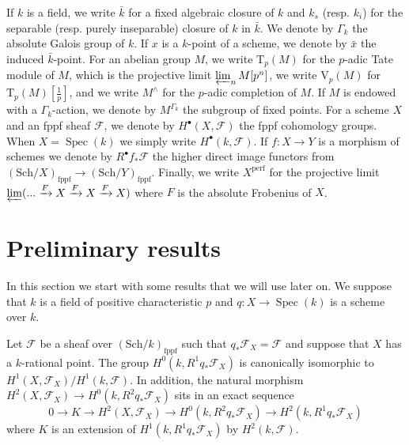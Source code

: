 \documentclass[11pt]{amsart}
\newcommand{\kbar}{{\bar{k}}}
\newcommand{\calF}{\mathcal{F}}
\DeclareMathOperator{\Spec}{Spec}
\newcommand{\fppf}{\mathrm{fppf}}
\newcommand{\ks}{{k_s}}
\newcommand{\ki}{{k_i}}
\newcommand{\Tp}{\mathrm{T}_p}
\newcommand{\Vp}{\mathrm{V}_p}
\begin{document}
If $k$ is a field, we write $\kbar$ for a fixed algebraic closure of $k$ and $\ks$ (resp. $\ki$) for the separable (resp. purely inseparable) closure of $k$ in $\kbar$. We denote by $\Gamma_k$ the absolute Galois group of $k$. If $x$ is a $k$-point of a scheme, we denote by $\bar{x}$ the induced $\kbar$-point. For an abelian group $M$, we write $\Tp(M)$ for the $p$-adic Tate module of $M$, which is the projective limit $\varprojlim_{n}M[p^n]$, we write $\Vp(M)$ for $\Tp(M)[\tfrac{1}{p}]$, and we write $M^\wedge$ for the $p$-adic completion of $M$. If $M$ is endowed with a $\Gamma_k$-action, we denote by $M^{\Gamma_k}$ the subgroup of fixed points. For a scheme $X$ and an fppf sheaf $\calF$, we denote by $H^{\bullet}(X,\calF)$ the fppf cohomology groups. When $X=\Spec(k)$ we simply write $H^{\bullet}(k,\calF)$. If $f:X\to Y$ is a morphism of schemes we denote by $R^{\bullet}f_*\calF$ the higher direct image functors from $(\mathrm{Sch}/X)_\fppf\to (\mathrm{Sch}/Y)_\fppf$. Finally, we write $X^{\mathrm{perf}}$ for the projective limit $\varprojlim(...\xrightarrow{F}X\xrightarrow{F}X\xrightarrow{F}X)$ where $F$ is the absolute Frobenius of $X$.
\section{Preliminary results}\label{prel-resu:s}

In this section we start with some results that we will use later on. We suppose that $k$ is a field of positive characteristic $p$ and $q:X\to \Spec(k)$ is a scheme over $k$.


\begin{lemm}\label{fppf-exte-scal:l}
Let $\calF$ be a sheaf over $(\mathrm{Sch}/k)_\fppf$ such that $q_*\calF_{X}=\calF$ and suppose that $X$ has a $k$-rational point. The group  $H^0(k,R^1q_*\calF_{X})$ is canonically isomorphic to $H^1(X,\calF_X)/H^1(k,\calF)$. In addition, the natural morphism $H^2(X,\calF_X)\to H^0(k,R^2q_*\calF_{X})$ sits in an exact sequence 
$$0\to K\to H^2(X,\calF_X)\to H^0(k,R^2q_*\calF_{X})\to H^2(k,R^1q_*\calF_{X})$$
where $K$ is an extension of $H^1(k,R^1q_*\calF_{X})$ by $H^2(k,\calF)$. 
\end{lemm}
\end{document}
